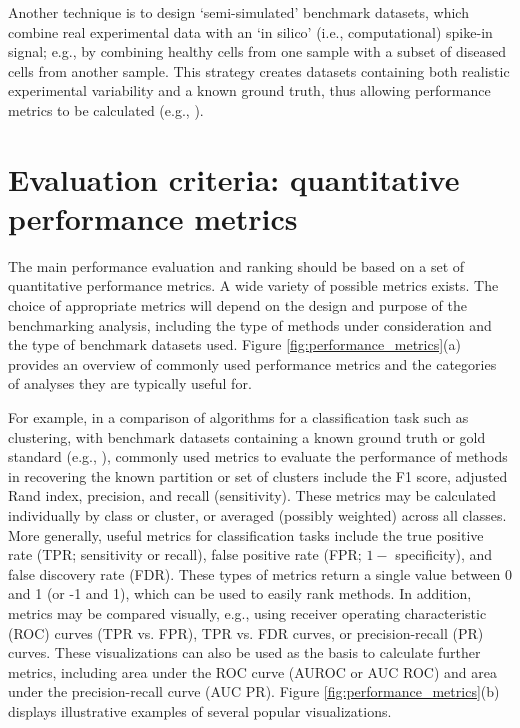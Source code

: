 \documentclass[12pt, a4paper]{article}
\begin{document}
Another technique is to design `semi-simulated' benchmark datasets, which combine real experimental data with an `in silico' (i.e., computational) spike-in signal; e.g., by combining healthy cells from one sample with a subset of diseased cells from another sample. This strategy creates datasets containing both realistic experimental variability and a known ground truth, thus allowing performance metrics to be calculated (e.g., \citep{Weber2018}).




\section*{Evaluation criteria: quantitative performance metrics}

The main performance evaluation and ranking should be based on a set of quantitative performance metrics. A wide variety of possible metrics exists. The choice of appropriate metrics will depend on the design and purpose of the benchmarking analysis, including the type of methods under consideration and the type of benchmark datasets used. Figure \ref{fig:performance_metrics}(a) provides an overview of commonly used performance metrics and the categories of analyses they are typically useful for.

For example, in a comparison of algorithms for a classification task such as clustering, with benchmark datasets containing a known ground truth or gold standard (e.g., \citep{Duo2018, Weber2016, Aghaeepour2013}), commonly used metrics to evaluate the performance of methods in recovering the known partition or set of clusters include the F1 score, adjusted Rand index, precision, and recall (sensitivity). These metrics may be calculated individually by class or cluster, or averaged (possibly weighted) across all classes. More generally, useful metrics for classification tasks include the true positive rate (TPR; sensitivity or recall), false positive rate (FPR; $1 -$ specificity), and false discovery rate (FDR). These types of metrics return a single value between 0 and 1 (or -1 and 1), which can be used to easily rank methods. In addition, metrics may be compared visually, e.g., using receiver operating characteristic (ROC) curves (TPR vs. FPR), TPR vs. FDR curves, or precision-recall (PR) curves. These visualizations can also be used as the basis to calculate further metrics, including area under the ROC curve (AUROC or AUC ROC) and area under the precision-recall curve (AUC PR). Figure \ref{fig:performance_metrics}(b) displays illustrative examples of several popular visualizations.
\end{document}
